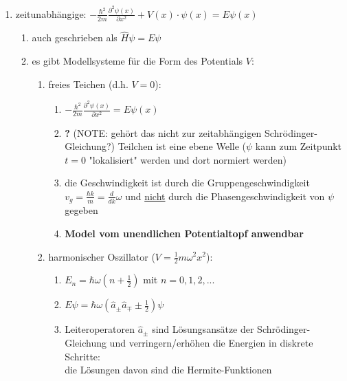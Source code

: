 \begin{enumerate}
    \item zeitunabhängige: $-\frac{\hbar^{2}}{2m}\frac{\partial^{2}\psi\left(x\right)}{\partial x^{2}}+V(x)\cdot\psi\left(x\right)=E\psi\left(x\right)$ 
    \begin{enumerate}
        \item auch geschrieben als $\hat{H}\psi=E\psi$
        \item es gibt Modellsysteme für die Form des Potentials $V$:
        \begin{enumerate}
            \item freies Teichen (d.h. $V=0$):
            \begin{enumerate}
                \item $-\frac{\hbar^{2}}{2m}\frac{\partial^{2}\psi\left(x\right)}{\partial x^{2}}=E\psi\left(x\right)$
                \item \textbf{?} (NOTE: gehört das nicht zur zeitabhängigen Schrödinger-Gleichung?) Teilchen ist eine ebene Welle ($\psi$ kann zum Zeitpunkt $t=0$ "lokalisiert" werden
                und dort normiert werden)
                \item die Geschwindigkeit ist durch die Gruppengeschwindigkeit $v_g=\frac{\hbar k}{m}=\frac{d}{dk}\omega$ und \underline{nicht}
                durch die Phasengeschwindigkeit von $\psi$ gegeben
                \item \textbf{Model vom unendlichen Potentialtopf anwendbar}  
            \end{enumerate}
            \item harmonischer Oszillator ($V=\frac{1}{2}m\omega^2x^2$):
            \begin{enumerate}
                \item $E_n=\hbar\omega(n+\frac{1}{2})$ mit $n=0,1,2,...$
                \item $E\psi=\hbar\omega(\hat{a}_\pm\hat{a}_\mp\pm\frac{1}{2})\psi$
                \item Leiteroperatoren $\hat{a}_\pm$ sind Lösungsansätze der Schrödinger-Gleichung und 
                verringern/erhöhen die Energien in diskrete Schritte: \\ die Lösungen davon sind die Hermite-Funktionen
            \end{enumerate}
        \end{enumerate}
    \end{enumerate}

\end{enumerate}



\newpage